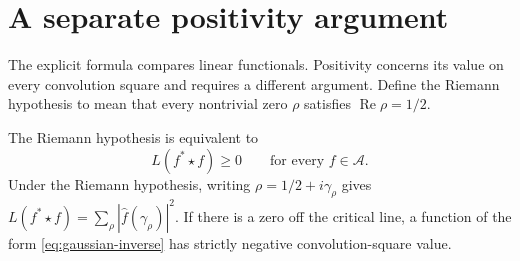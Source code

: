 \documentclass[11pt]{article}
\numberwithin{equation}{section}
\newcommand{\A}{\mathcal A}
\begin{document}
\section{A separate positivity argument}
\label{sec:positivity}

The explicit formula compares linear functionals.
Positivity concerns its value on every convolution square and requires a
different argument.  Define the Riemann hypothesis to mean that every
nontrivial zero $\rho$ satisfies $\operatorname{Re}\rho=1/2$.

\begin{theorem}
\label{thm:positivity}
The Riemann hypothesis is equivalent to
\begin{equation}
 L(f^*\star f)\geq0\qquad\text{for every }f\in\A.
 \label{eq:positivity}
\end{equation}
Under the Riemann hypothesis, writing $\rho=1/2+i\gamma_\rho$ gives
$L(f^*\star f)=\sum_\rho|\widehat f(\gamma_\rho)|^2$.
If there is a zero off the critical line, a function of the form
\eqref{eq:gaussian-inverse} has strictly negative convolution-square value.
\end{theorem}
\end{document}
